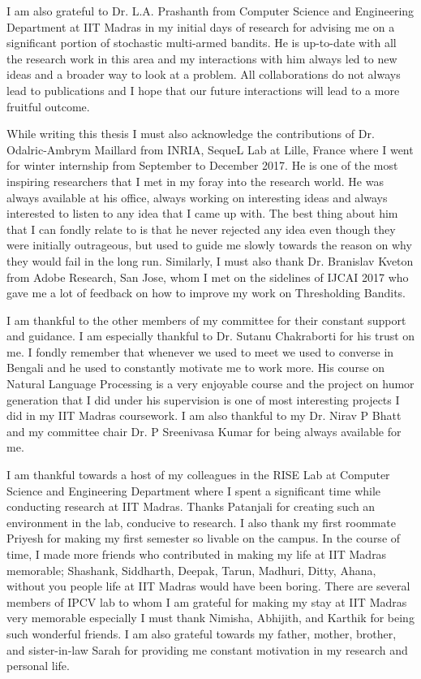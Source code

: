 I am also grateful to Dr. L.A. Prashanth from Computer Science and Engineering Department at IIT Madras in my initial days of research for advising me on a significant portion of stochastic multi-armed bandits. He is up-to-date with all the research work in this area and my interactions with him always led to new ideas and a broader way to look at a problem. All collaborations do not always lead to publications and I hope that our future interactions will lead to a more fruitful outcome.

While writing this thesis I must also acknowledge the contributions of Dr. Odalric-Ambrym Maillard from INRIA, SequeL Lab at Lille, France where I went for winter internship from September to December 2017. He is one of the most inspiring researchers that I met in my foray into the research world. He was always available at his office, always working on interesting ideas and always interested to listen to any idea that I came up with. The best thing about him that I can fondly relate to is that he never rejected any idea even though they were initially outrageous, but used to guide me slowly towards the reason on why they would fail in the long run. Similarly, I must also thank Dr. Branislav Kveton from Adobe Research, San Jose, whom I met on the sidelines of IJCAI 2017 who gave me a lot of feedback on how to improve my work on Thresholding Bandits. 

I am thankful to the other members of my committee for their constant support and guidance. I am especially thankful to Dr.  Sutanu Chakraborti for his trust on me. I fondly remember that whenever we used to meet we used to converse in Bengali and he used to constantly motivate me to work more. His course on Natural Language Processing is a very enjoyable course and the project on humor generation that I did under his supervision is one of most interesting projects I did in my IIT Madras coursework. I am also thankful to my Dr. Nirav P Bhatt and my committee chair Dr. P Sreenivasa Kumar for being always available for me.


I am thankful towards a host of my colleagues in the RISE Lab at Computer Science and Engineering Department where I spent a significant time while conducting research at IIT Madras. Thanks Patanjali for creating such an environment in the lab, conducive to research. I also thank my first roommate Priyesh for making my first semester so livable on the campus. In the course of time, I made more friends who contributed in making my life at IIT Madras memorable; Shashank, Siddharth, Deepak, Tarun, Madhuri, Ditty, Ahana, without you people life at IIT Madras would have been boring. There are several members of IPCV lab to whom I am grateful for making my stay at IIT Madras very memorable especially I must thank Nimisha, Abhijith, and Karthik for being such wonderful friends. I am also grateful towards my father, mother, brother, and sister-in-law Sarah for providing me constant motivation in my research and personal life. 

